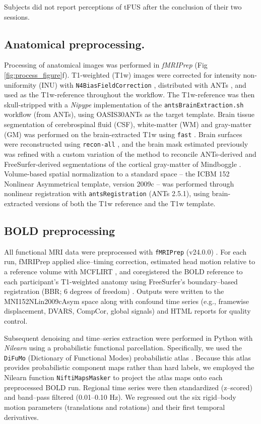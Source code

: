 Subjects did not report perceptions of tFUS after the conclusion of their two sessions. 

\subsection*{Anatomical preprocessing.}
\noindent
Processing of anatomical images was performed in \emph{fMRIPrep} \cite{fmriprep1,fmriprep2,nipype1,nipype2} (Fig \ref{fig:process_figure}f). T1-weighted (T1w) images were corrected for intensity non-uniformity (INU) with \texttt{N4BiasFieldCorrection} \cite{n4}, distributed with ANTs \cite{ants}, and used as the T1w-reference throughout the workflow. The T1w-reference was then skull-stripped with a \emph{Nipype} implementation of the \texttt{antsBrainExtraction.sh} workflow (from ANTs), using OASIS30ANTs as the target template. Brain tissue segmentation of cerebrospinal fluid (CSF), white-matter (WM) and gray-matter (GM) was performed on the brain-extracted T1w using \texttt{fast} \cite{fsl_fast}. Brain surfaces were reconstructed using \texttt{recon-all} \cite{fs_reconall}, and the brain mask estimated previously was refined with a custom variation of the method to reconcile ANTs-derived and FreeSurfer-derived segmentations of the cortical gray-matter of Mindboggle \cite{mindboggle}. Volume-based spatial normalization to a standard space -- the ICBM 152 Nonlinear Asymmetrical template, version 2009c \cite{mni152nlin2009casym} -- was performed through nonlinear registration with \texttt{antsRegistration} (ANTs 2.5.1), using brain-extracted versions of both the T1w reference and the T1w template. 


\subsection*{BOLD preprocessing}
\noindent 
All functional MRI data were preprocessed with \texttt{fMRIPrep} (v24.0.0) \cite{fmriprep1,fmriprep2}. For each run, fMRIPrep applied slice–timing correction, estimated head motion relative to a reference volume with MCFLIRT \cite{mcflirt}, and coregistered the BOLD reference to each participant’s T1-weighted anatomy using FreeSurfer’s boundary–based registration (BBR; 6 degrees of freedom) \cite{bbr}. Outputs were written to the MNI152NLin2009cAsym space along with confound time series (e.g., framewise displacement, DVARS, CompCor, global signals) and HTML reports for quality control.

Subsequent denoising and time–series extraction were performed in Python with \emph{Nilearn} \cite{nilearn} using a probabilistic functional parcellation. Specifically, we used the \texttt{DiFuMo} (Dictionary of Functional Modes) probabilistic atlas \cite{dadi2020fine}. Because this atlas provides probabilistic component maps rather than hard labels, we employed the Nilearn function \texttt{NiftiMapsMasker} to project the atlas maps onto each preprocessed BOLD run. Regional time series were then standardized (z–scored) and band–pass filtered (0.01–0.10 Hz). We regressed out the six rigid–body motion parameters (translations and rotations) and their first temporal derivatives. 

